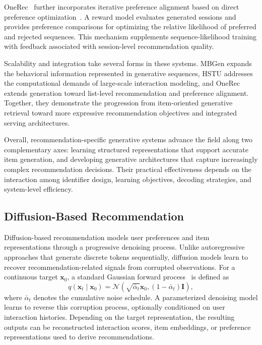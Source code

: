\documentclass[sigconf,nonacm]{acmart}
\begin{document}
OneRec~\cite{onerec} further incorporates
iterative preference alignment based on direct
preference optimization~\cite{dpo}. A reward model
evaluates generated sessions and provides
preference comparisons for optimizing the
relative likelihood of preferred and rejected
sequences. This mechanism supplements
sequence-likelihood training with feedback
associated with session-level recommendation
quality.

Scalability and integration take several forms
in these systems. MBGen expands
the behavioral information represented in
generative sequences, HSTU addresses the
computational demands of large-scale interaction
modeling, and OneRec extends generation toward
list-level recommendation and preference alignment.
Together, they demonstrate the progression
from item-oriented generative retrieval toward
more expressive recommendation objectives
and integrated serving architectures.

Overall, recommendation-specific generative
systems advance the field along two complementary
axes: learning structured representations that
support accurate item generation, and developing
generative architectures that capture increasingly
complex recommendation decisions. Their practical
effectiveness depends on the interaction among
identifier design, learning objectives, decoding
strategies, and system-level efficiency.


\subsection{Diffusion-Based Recommendation}
\label{sec:diffusion}

Diffusion-based recommendation models user preferences and
item representations through a progressive denoising process.
Unlike autoregressive approaches that generate discrete
tokens sequentially, diffusion models learn to recover
recommendation-related signals from corrupted observations.
For a continuous target $\mathbf{x}_0$, a standard Gaussian
forward process~\cite{ddpm} is defined as
\begin{equation}
    q(\mathbf{x}_t \mid \mathbf{x}_0)
    =
    \mathcal{N}\left(
    \sqrt{\bar{\alpha}_t}\mathbf{x}_0,
    (1-\bar{\alpha}_t)\mathbf{I}
    \right),
    \label{eq:diffusion_forward}
\end{equation}
where $\bar{\alpha}_t$ denotes the cumulative noise
schedule. A parameterized denoising model learns to
reverse this corruption process, optionally conditioned
on user interaction histories. Depending on the target
representation, the resulting outputs can be reconstructed
interaction scores, item embeddings, or preference
representations used to derive recommendations.
\end{document}
